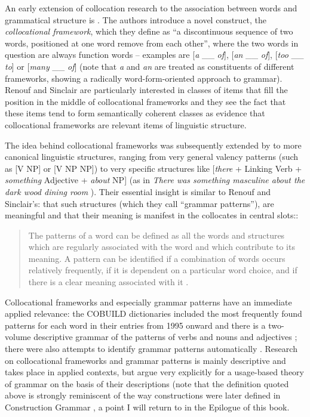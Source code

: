 An early extension of collocation research to the association between words and grammatical structure is \citet{renouf_collocational_1991}. The authors introduce a novel construct, the \textit{collocational framework}, which they define as ``a discontinuous sequence of two words, positioned at one word remove from each other'', where the two words in question are always function words -- examples are [\textit{a} \_\_ \textit{of}], [\textit{an} \_\_ \textit{of}], [\textit{too} \_\_ \textit{to}] or [\textit{many} \_\_ \textit{of}] (note that \textit{a} and \textit{an} are treated as constituents of different frameworks, showing a radically word-form-oriented approach to grammar). Renouf and Sinclair are particularly interested in classes of items that fill the position in the middle of collocational frameworks and they see the fact that these items tend to form semantically coherent classes as evidence that collocational frameworks are relevant items of linguistic structure.

The idea behind collocational frameworks was subsequently extended by \citet{hunston_pattern_2000} to more canonical linguistic structures, ranging from very general valency patterns (such as [V NP] or [V NP NP]) to very specific structures like [\textit{there} + Linking Verb + \textit{something} Adjective + \textit{about} NP] (as in \textit{There was something masculine about the dark wood dining room} \citet[51, 53, 106]{hunston_pattern_2000}). Their essential insight is similar to Renouf and Sinclair's: that such structures (which they call ``grammar patterns''), are meaningful and that their meaning is manifest in the collocates in central slots::

\begin{quotation}
The patterns of a word can be defined as all the words and structures which are regularly associated with the word and which contribute to its meaning. A pattern can be identified if a combination of words occurs relatively frequently, if it is dependent on a particular word choice, and if there is a clear meaning associated with it \citep[37]{hunston_pattern_2000}.
\end{quotation}

Collocational frameworks and especially grammar patterns have an immediate applied relevance: the COBUILD dictionaries included the most frequently found patterns for each word in their entries from 1995 onward and there is a two-volume descriptive grammar of the patterns of verbs \citep{francis_collins_1996} and nouns and adjectives \citep{francis_collins_1998}; there were also attempts to identify grammar patterns automatically \citep[cf.][]{mason_automatic_2004}. Research on collocational frameworks and grammar patterns is mainly descriptive and takes place in applied contexts, but \citet{hunston_pattern_2000} argue very explicitly for a usage-based theory of grammar on the basis of their descriptions (note that the definition quoted above is strongly reminiscent of the way constructions were later defined in Construction Grammar \citep[4]{goldberg_constructions:_1995}, a point I will return to in the Epilogue of this book.

